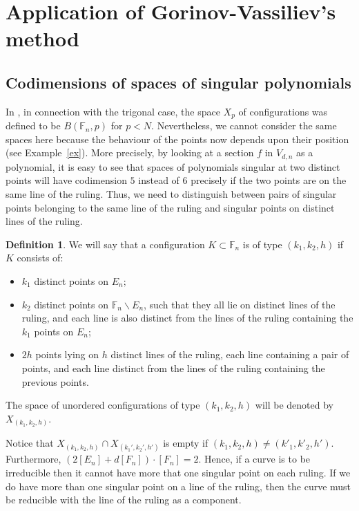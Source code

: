 \documentclass[10pt,a4paper,twoside]{amsart}
\theoremstyle{plain}
\theoremstyle{definition}
\newtheorem{defin}{Definition}
\theoremstyle{remark}
\begin{document}
\section{Application of Gorinov-Vassiliev's method} \label{sec-method}
\subsection{Codimensions of spaces of singular polynomials}  \label{sec-codim}
In \cite[Section 3]{Zhe}, in connection with the trigonal case, the space $X_p$ 
of configurations was defined to be $B(\mathbb{F}_n,p)$ for $p<N$. Nevertheless, we cannot consider the same spaces here because the behaviour of the points now depends upon their position (see Example~\ref{ex}). 
More precisely, by looking at a section $f$ in $V_{d,n}$ as a polynomial, it is easy to see that spaces of polynomials singular at two distinct points will have codimension $5$ instead of $6$ precisely if the two points are on the same line of the ruling. Thus, we need to distinguish between pairs of singular points belonging to the same line of the ruling and singular points on distinct lines of the ruling. 

\begin{defin}\label{def_config}
We will say that a configuration $K\subset\mathbb{F}_n$ is of type $(k_1,k_2,h)$ if $K$ consists of: 
\begin{itemize}
\item $k_1$ distinct points on $E_n;$
\item $k_2$ distinct points on $\mathbb{F}_n\backslash E_n$, such that they all lie on distinct lines of the ruling, and each line is also distinct from the lines of the ruling containing the $k_1$ points on $E_n$; 
\item $2h$ points lying on $h$ distinct lines of the ruling, each line containing a pair of points, and each line distinct from the lines of the ruling containing the previous points.
\end{itemize} 
The space of unordered configurations of type $(k_1,k_2,h)$ will be denoted by $X_{(k_1,k_2,h)}$. 
\end{defin}

Notice that $X_{(k_1,k_2,h)} \cap X_{(k_1',k_2',h')}$ is empty if $(k_1,k_2,h) \neq (k'_1,k'_2,h')$. 
Furthermore, $(2\left[E_n\right]+d\left[F_n\right])\cdot \left[F_n\right]=2$. Hence, if a curve is to be irreducible then it cannot have more that one singular point on each ruling. If we do have more than one singular point on a line of the ruling, then the curve must be reducible with the line of the ruling as a component. 
\end{document}
